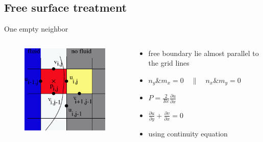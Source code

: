 \documentclass{beamer}
\begin{document}
\subsection{Free surface treatment}
	\begin{frame}{One empty neighbor}
	  \begin{columns}
	 	\begin{column}[c]{0.4\textwidth}
		 \begin{figure}
			\includegraphics[width=1\textwidth]{pic/one.pdf}
		 \end{figure}			
		\end{column}
			\begin{column}[c]{0.6\textwidth}
				\begin{itemize}
					\item  free boundary lie almost parallel to the grid lines
					\item $ n_y \& m_x=0	\quad \| \quad n_x \& m_y=0  $
					\item $ P=\frac{2}{Re} \frac{\partial u}{\partial x} $
					\item $ \frac{\partial u}{\partial y}+ \frac{\partial v}{\partial x}=0 $
					\item using continuity equation
				\end{itemize}
			\end{column}
	 \end{columns}
	\end{frame}	
\end{document}
